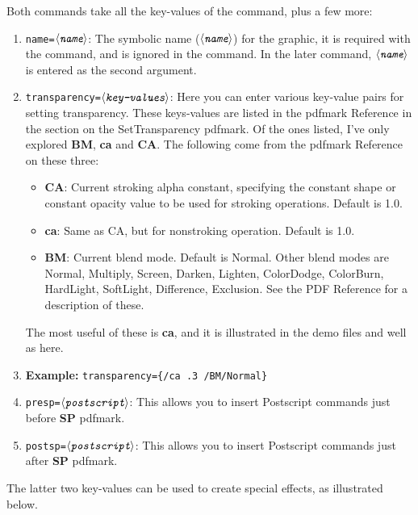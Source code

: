 \documentclass{article}
\def\anglemeta#1{$\langle\textit{\texttt{#1}}\rangle$}
\def\meta#1{\textit{\texttt{#1}}}
\let\meta\anglemeta
\begin{document}
\KVP Both commands take all the key-values of the  command, plus
a few more:
\begin{enumerate}
    \item \texttt{name=\meta{name}}: The symbolic name (\meta{name}) for
        the graphic, it is required with the  command,
        and is ignored in the  command. In the later command,
        \meta{name} is entered as the second argument.

    \item \texttt{transparency=\meta{key-values}}: Here you can enter
    various key-value pairs for setting transparency. These
    keys-values are listed in the pdfmark Reference in the section
    on the SetTransparency pdfmark. Of the ones listed, I've only explored
    \textbf{BM}, \textbf{ca} and \textbf{CA}. The following come from the pdfmark Reference on these three:
    \begin{itemize}
        \item \textbf{CA}: Current stroking alpha constant,
        specifying the constant shape or constant opacity value to
        be used for stroking operations. Default is 1.0.
        \item \textbf{ca}: Same as CA, but for nonstroking operation. Default is 1.0.
        \item \textbf{BM}: Current blend mode. Default is Normal.
            Other blend modes are Normal, Multiply, Screen,
            Darken, Lighten, ColorDodge, ColorBurn, HardLight,
            SoftLight, Difference, Exclusion. See the PDF
            Reference for a description of these.

    \end{itemize}
    The most useful of these is \textbf{ca}, and it is illustrated
    in the demo files and well as here.

    \item[] \textbf{Example:} \verb!transparency={/ca .3 /BM/Normal}!

    \item \texttt{presp=\meta{postscript}}: This allows you to insert
        Postscript commands just before \textbf{SP} pdfmark.
    \item \texttt{postsp=\meta{postscript}}: This allows you to insert
        Postscript commands just after \textbf{SP} pdfmark.
\end{enumerate}
The latter two key-values can be used to create special effects, as illustrated below.
\end{document}
